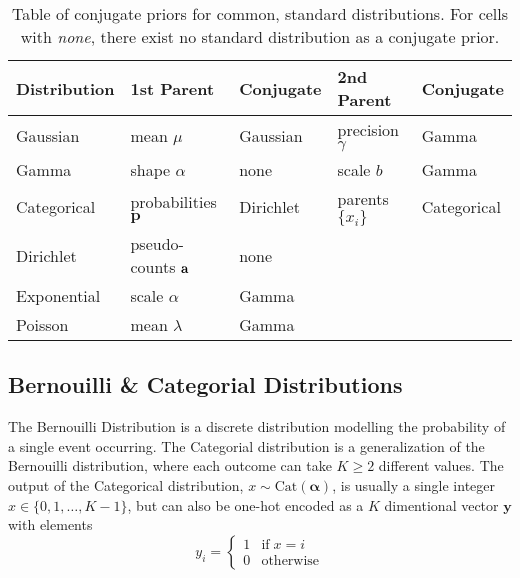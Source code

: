 \begin{table}[h]
\begin{tabular}{lllll}
\hline
\multicolumn{1}{|l|}{\textbf{Distribution}} & \multicolumn{1}{l|}{\textbf{1st Parent}}        & \multicolumn{1}{l|}{\textbf{Conjugate}} & \multicolumn{1}{l|}{\textbf{2nd Parent}} & \multicolumn{1}{l|}{\textbf{Conjugate}} \\ \hline
\multicolumn{1}{|l|}{Gaussian}              & \multicolumn{1}{l|}{mean $\mu$}                 & \multicolumn{1}{l|}{Gaussian}           & \multicolumn{1}{l|}{precision $\gamma$}  & \multicolumn{1}{l|}{Gamma}              \\ \hline
\multicolumn{1}{|l|}{Gamma}                 & \multicolumn{1}{l|}{shape $\alpha$}             & \multicolumn{1}{l|}{none}               & \multicolumn{1}{l|}{scale $b$}           & \multicolumn{1}{l|}{Gamma}              \\ \hline
\multicolumn{1}{|l|}{Categorical}              & \multicolumn{1}{l|}{probabilities $\mathbf{p}$} & \multicolumn{1}{l|}{Dirichlet}          & \multicolumn{1}{l|}{parents $\{x_i\}$}   & \multicolumn{1}{l|}{Categorical}           \\ \hline
\multicolumn{1}{|l|}{Dirichlet}             & \multicolumn{1}{l|}{pseudo-counts $\bf a$}      & \multicolumn{1}{l|}{none}               & \multicolumn{1}{l|}{}                    & \multicolumn{1}{l|}{}                   \\ \hline
\multicolumn{1}{|l|}{Exponential}           & \multicolumn{1}{l|}{scale $\alpha$}             & \multicolumn{1}{l|}{Gamma}              & \multicolumn{1}{l|}{}                    & \multicolumn{1}{l|}{}                   \\ \hline
\multicolumn{1}{|l|}{Poisson}               & \multicolumn{1}{l|}{mean $\lambda$}             & \multicolumn{1}{l|}{Gamma}              & \multicolumn{1}{l|}{}                    & \multicolumn{1}{l|}{}                   \\ \hline
\end{tabular}
\caption{Table of conjugate priors for common, standard distributions. For cells with \textit{none}, there exist no standard distribution as a conjugate prior. \cite[p.~676]{winnbishop}}
\label{table:conjugate_priors}
\end{table}


\subsection{Bernouilli \& Categorial Distributions}
The Bernouilli Distribution is a discrete distribution modelling the probability of a single event occurring. The Categorial distribution is a generalization of the Bernouilli distribution, where each outcome can take $K \geq 2$ different values. The output of the Categorical distribution, $x \sim \text{Cat}(\boldsymbol{\alpha})$, is usually a single integer $x \in \{0, 1, \dots, K-1\}$, but can also be one-hot encoded as a $K$ dimentional vector $\mathbf{y}$ with elements $$y_i = \begin{cases}
    1 & \text{if} \; x = i\\ 0 & \text{otherwise}
\end{cases}$$
